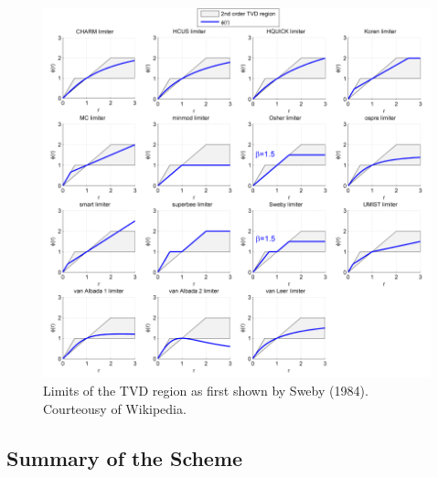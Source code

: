 \documentclass{warpdoc}
\begin{document}
%
\begin{figure}[h]
 \begin{center}
   \includegraphics[width=5.9in]{LimiterPlots1.png}
 \end{center}
\caption{Limits of the TVD region as first shown by Sweby (1984). Courteousy of Wikipedia.}
\label{fig:TVD_limiter_region}
\end{figure}
%



\subsection{Summary of the Scheme}
\end{document}
